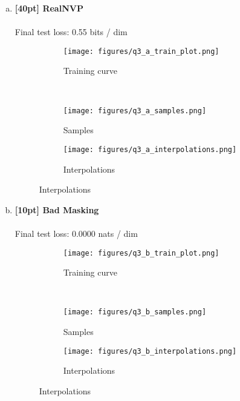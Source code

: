 \documentclass{article}
\begin{document}
\begin{enumerate}[(a)]
\item {\bf [40pt] RealNVP} \\\\
Final test loss: 0.55  bits / dim
\begin{figure}[H]
    \centering
    \begin{subfigure}{0.45\textwidth}
        \centering
        \texttt{[image: figures/q3\_a\_train\_plot.png]}
        \caption{Training curve}
    \end{subfigure}
    \\
    \begin{subfigure}{0.48\textwidth}
        \centering
        \texttt{[image: figures/q3\_a\_samples.png]}
        \caption{Samples}
    \end{subfigure}
    \begin{subfigure}{0.48\textwidth}
        \centering
        \texttt{[image: figures/q3\_a\_interpolations.png]}
        \caption{Interpolations}
    \end{subfigure}
\end{figure}
\newpage

\item {\bf [10pt] Bad Masking} \\\\
Final test loss: 0.0000  nats / dim
\begin{figure}[H]
    \centering
    \begin{subfigure}{0.45\textwidth}
        \centering
        \texttt{[image: figures/q3\_b\_train\_plot.png]}
        \caption{Training curve}
    \end{subfigure}
    \\
    \begin{subfigure}{0.48\textwidth}
        \centering
        \texttt{[image: figures/q3\_b\_samples.png]}
        \caption{Samples}
    \end{subfigure}
    \begin{subfigure}{0.48\textwidth}
        \centering
        \texttt{[image: figures/q3\_b\_interpolations.png]}
        \caption{Interpolations}
    \end{subfigure}
\end{figure}
\end{enumerate}
\end{document}
